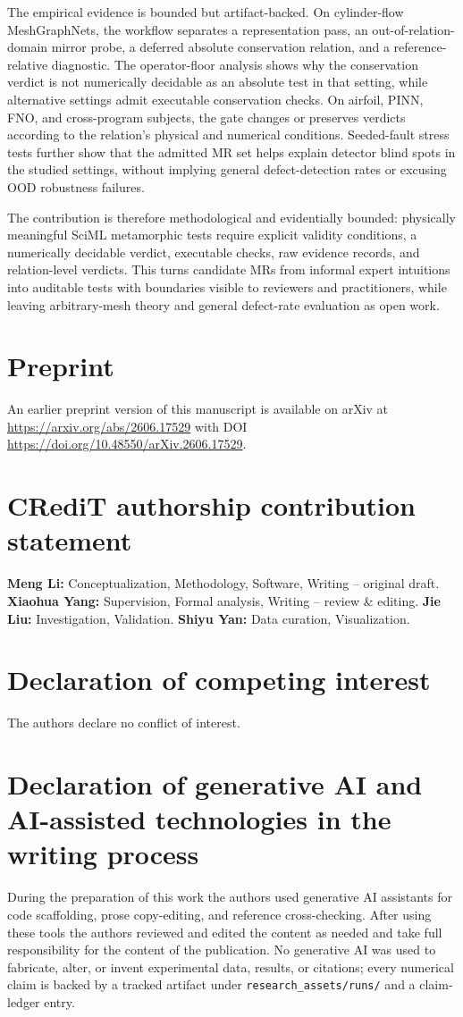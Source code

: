 \documentclass[preprint,12pt]{elsarticle}
\begin{document}
The empirical evidence is bounded but artifact-backed. On cylinder-flow MeshGraphNets, the workflow separates a representation pass, an out-of-relation-domain mirror probe, a deferred absolute conservation relation, and a reference-relative diagnostic. The operator-floor analysis shows why the conservation verdict is not numerically decidable as an absolute test in that setting, while alternative settings admit executable conservation checks. On airfoil, PINN, FNO, and cross-program subjects, the gate changes or preserves verdicts according to the relation's physical and numerical conditions. Seeded-fault stress tests further show that the admitted MR set helps explain detector blind spots in the studied settings, without implying general defect-detection rates or excusing OOD robustness failures.

The contribution is therefore methodological and evidentially bounded: physically meaningful SciML metamorphic tests require explicit validity conditions, a numerically decidable verdict, executable checks, raw evidence records, and relation-level verdicts. This turns candidate MRs from informal expert intuitions into auditable tests with boundaries visible to reviewers and practitioners, while leaving arbitrary-mesh theory and general defect-rate evaluation as open work.

\section*{Preprint}
An earlier preprint version of this manuscript is available on arXiv at \url{https://arxiv.org/abs/2606.17529} with DOI \url{https://doi.org/10.48550/arXiv.2606.17529}.

\section*{CRediT authorship contribution statement}
\textbf{Meng Li:} Conceptualization, Methodology, Software, Writing -- original draft. \textbf{Xiaohua Yang:} Supervision, Formal analysis, Writing -- review \& editing. \textbf{Jie Liu:} Investigation, Validation. \textbf{Shiyu Yan:} Data curation, Visualization.

\section*{Declaration of competing interest}
The authors declare no conflict of interest.

\section*{Declaration of generative AI and AI-assisted technologies in the writing process}
During the preparation of this work the authors used generative AI assistants for code scaffolding, prose copy-editing, and reference cross-checking. After using these tools the authors reviewed and edited the content as needed and take full responsibility for the content of the publication. No generative AI was used to fabricate, alter, or invent experimental data, results, or citations; every numerical claim is backed by a tracked artifact under \texttt{research\_assets/runs/} and a claim-ledger entry.
\end{document}
